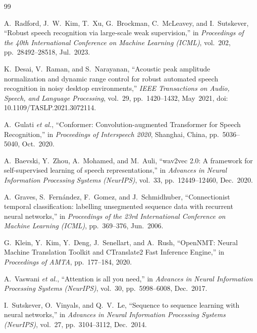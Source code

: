 \documentclass[12pt,letterpaper,oneside]{report}
\begin{document}
\clearpage
\begin{thebibliography}{99}

A.~Radford, J.~W.~Kim, T.~Xu, G.~Brockman, C.~McLeavey, and I.~Sutskever,
``Robust speech recognition via large-scale weak supervision,''
in \textit{Proceedings of the 40th International Conference on Machine Learning (ICML)},
vol.~202, pp.~28492--28518, Jul.~2023.

K.~Desai, V.~Raman, and S.~Narayanan,
``Acoustic peak amplitude normalization and dynamic range control for robust automated speech recognition in noisy desktop environments,''
\textit{IEEE Transactions on Audio, Speech, and Language Processing},
vol.~29, pp.~1420--1432, May~2021, doi: 10.1109/TASLP.2021.3072114.

A.~Gulati \textit{et al.},
``Conformer: Convolution-augmented Transformer for Speech Recognition,''
in \textit{Proceedings of Interspeech 2020}, Shanghai, China, pp.~5036--5040, Oct.~2020.

A.~Baevski, Y.~Zhou, A.~Mohamed, and M.~Auli,
``wav2vec 2.0: A framework for self-supervised learning of speech representations,''
in \textit{Advances in Neural Information Processing Systems (NeurIPS)},
vol.~33, pp.~12449--12460, Dec.~2020.

A.~Graves, S.~Fern{\'a}ndez, F.~Gomez, and J.~Schmidhuber,
``Connectionist temporal classification: labelling unsegmented sequence data with recurrent neural networks,''
in \textit{Proceedings of the 23rd International Conference on Machine Learning (ICML)},
pp.~369--376, Jun.~2006.

G.~Klein, Y.~Kim, Y.~Deng, J.~Senellart, and A.~Rush,
``OpenNMT: Neural Machine Translation Toolkit and CTranslate2 Fast Inference Engine,''
in \textit{Proceedings of AMTA}, pp.~177--184, 2020.

A.~Vaswani \textit{et al.},
``Attention is all you need,''
in \textit{Advances in Neural Information Processing Systems (NeurIPS)},
vol.~30, pp.~5998--6008, Dec.~2017.

I.~Sutskever, O.~Vinyals, and Q.~V.~Le,
``Sequence to sequence learning with neural networks,''
in \textit{Advances in Neural Information Processing Systems (NeurIPS)},
vol.~27, pp.~3104--3112, Dec.~2014.


\end{thebibliography}
\end{document}
